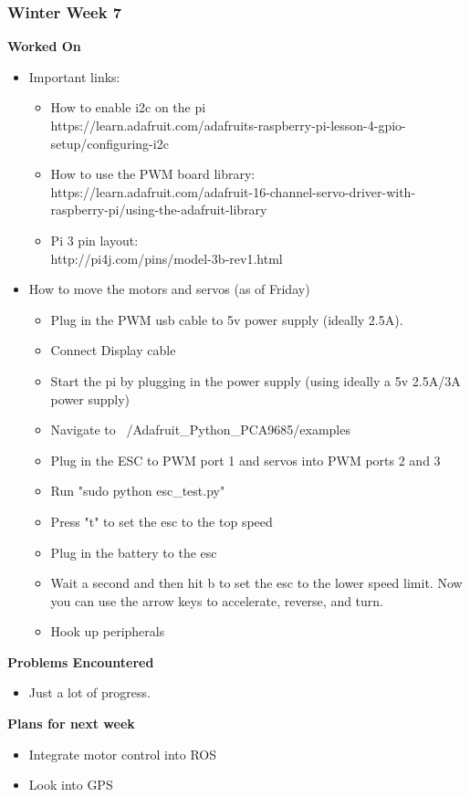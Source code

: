 \documentclass[compsoc,draftclsnofoot,onecolumn,10pt]{IEEEtran}
\begin{document}
\subsubsection*{Winter Week 7}
\textbf{Worked On}
\begin{itemize}
    \item Important links:
    \begin{itemize}
        \item How to enable i2c on the pi\\
        https://learn.adafruit.com/adafruits-raspberry-pi-lesson-4-gpio-setup/configuring-i2c
        \item How to use the PWM board library:\\
        https://learn.adafruit.com/adafruit-16-channel-servo-driver-with-raspberry-pi/using-the-adafruit-library
        \item Pi 3 pin layout:\\
        http://pi4j.com/pins/model-3b-rev1.html
    \end{itemize}
    \item How to move the motors and servos (as of Friday)
    \begin{itemize}
        \item Plug in the PWM usb cable to 5v power supply (ideally 2.5A).
        \item Connect Display cable
        \item Start the pi by plugging in the power supply (using ideally a 5v 2.5A/3A power supply)
        \item Navigate to ~/Adafruit\_Python\_PCA9685/examples
        \item Plug in the ESC to PWM port 1 and servos into PWM ports 2 and 3
        \item Run "sudo python esc\_test.py"
        \item Press "t" to set the esc to the top speed
        \item Plug in the battery to the esc
        \item Wait a second and then hit b to set the esc to the lower speed limit. Now you can use the arrow keys to accelerate, reverse, and turn.
        \item Hook up peripherals
    \end{itemize}
\end{itemize}
\textbf{Problems Encountered}
\begin{itemize}
    \item Just a lot of progress.
\end{itemize}
\textbf{Plans for next week}
\begin{itemize}
    \item Integrate motor control into ROS
    \item Look into GPS
\end{itemize}
\end{document}

